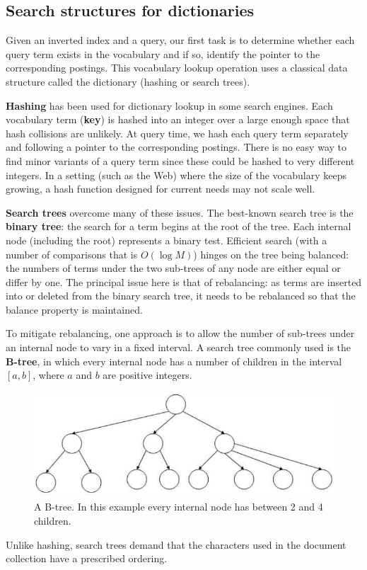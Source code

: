 \documentclass[letterpaper,11pt]{article}
\begin{document}
\subsection{Search structures for dictionaries}
Given an inverted index and a query, our first task is to determine whether each query term exists in the vocabulary and if so, identify the pointer to the corresponding postings. This vocabulary lookup operation uses a classical data structure called the dictionary (hashing or search trees).

\textbf{Hashing} has been used for dictionary lookup in some search engines. Each
vocabulary term (\textbf{key}) is hashed into an integer over a large enough space that hash collisions are unlikely. At query time, we hash each query term separately and following a pointer to the corresponding postings. There is no easy way to find minor variants of a query term since these could be hashed to very different integers. In a setting (such as the Web) where the size of the vocabulary keeps growing, a hash function designed for current needs may not scale well.

\textbf{Search trees} overcome many of these issues. The best-known search tree is the \textbf{binary tree}: the search for a term begins at the root of the tree. Each internal node (including the root) represents a binary test. Efficient search (with a number of comparisons that is $O(\log M)$) hinges on the tree being balanced: the numbers of terms under the two sub-trees of any node are either equal or differ by one. The principal issue here is that of rebalancing: as terms are inserted into or deleted from the binary search tree, it needs to be rebalanced so that the balance property is maintained.

To mitigate rebalancing, one approach is to allow the number of sub-trees under an internal node to vary in a fixed interval. A search tree commonly used is the \textbf{B-tree}, in which every internal node
has a number of children in the interval $[a, b]$, where $a$ and $b$ are positive integers.
\begin{figure}[H]
    \centering
    \includegraphics[scale=0.55]{sect3/figure_3_2.png}
    \caption{A B-tree. In this example every internal node has between 2 and 4 children.}
\end{figure}
Unlike hashing, search trees demand that the characters used in the document collection have a prescribed ordering.
\end{document}
